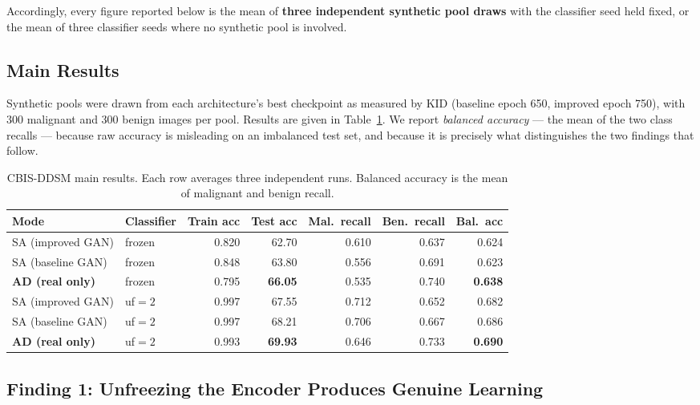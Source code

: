 Accordingly, every figure reported below is the mean of \textbf{three independent synthetic pool
draws} with the classifier seed held fixed, or the mean of three classifier seeds where no synthetic
pool is involved.

\subsection{Main Results}

Synthetic pools were drawn from each architecture's best checkpoint as measured by KID (baseline epoch
650, improved epoch 750), with 300 malignant and 300 benign images per pool. Results are given in
Table~\ref{tab:ddsm_main}. We report \emph{balanced accuracy} --- the mean of the two class recalls ---
because raw accuracy is misleading on an imbalanced test set, and because it is precisely what
distinguishes the two findings that follow.

\begin{table}[h]
\centering
\caption{CBIS-DDSM main results. Each row averages three independent runs. Balanced accuracy is the
mean of malignant and benign recall.}
\label{tab:ddsm_main}
\begin{tabular}{llrrrrr}
\toprule
\textbf{Mode} & \textbf{Classifier} & \textbf{Train acc} & \textbf{Test acc} &
\textbf{Mal.\ recall} & \textbf{Ben.\ recall} & \textbf{Bal.\ acc} \\
\midrule
SA (improved GAN) & frozen & 0.820 & 62.70 & 0.610 & 0.637 & 0.624 \\
SA (baseline GAN) & frozen & 0.848 & 63.80 & 0.556 & 0.691 & 0.623 \\
\textbf{AD (real only)} & frozen & 0.795 & \textbf{66.05} & 0.535 & 0.740 & \textbf{0.638} \\
\midrule
SA (improved GAN) & uf${=}2$ & 0.997 & 67.55 & 0.712 & 0.652 & 0.682 \\
SA (baseline GAN) & uf${=}2$ & 0.997 & 68.21 & 0.706 & 0.667 & 0.686 \\
\textbf{AD (real only)} & uf${=}2$ & 0.993 & \textbf{69.93} & 0.646 & 0.733 & \textbf{0.690} \\
\bottomrule
\end{tabular}
\end{table}

\subsection{Finding 1: Unfreezing the Encoder Produces Genuine Learning}

